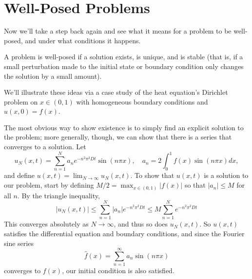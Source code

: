 \documentclass[../m180main.tex]{subfiles}
\begin{document}
\section{Well-Posed Problems}
Now we'll take a step back again and see what it means for a problem to be well-posed, and under what conditions it happens.

\begin{definition}
    A problem is well-posed if a solution exists, is unique, and is stable (that is, if a small perturbation made to the initial state or boundary condition only changes the solution by a small amount).
\end{definition}

We'll illustrate these ideas via a case study of the heat equation's Dirichlet problem on $x \in (0,1)$ with homogeneous boundary conditions and $u(x,0) = f(x)$.

\begin{example}[Existence]
    The most obvious way to show existence is to simply find an explicit solution to the problem; more generally, though, we can show that there is a series that converges to a solution.
    Let
    \[ u_N(x,t) = \sum_{n=1}^{N} a_n e^{-n^2 \pi^2 Dt} \sin(n\pi x), \quad a_n = 2 \int_{0}^{1} f(x) \sin(n\pi x)dx, \]
    and define $u(x,t) = \lim_{N \to \infty} u_N(x,t)$.
    To show that $u(x,t)$ is a solution to our problem, start by defining $M / 2 = \max_{x \in (0,1)} |f(x)|$ so that $|a_n| \leq M$ for all $n$.
    By the triangle inequality,
    \[ |u_N(x,t)| \leq \sum_{n=1}^{N} |a_n| e^{-n^2 \pi^2 Dt} \leq M \sum_{n=1}^{N} e^{-n^2 \pi^2 Dt} \]
    This converges absolutely as $N \to \infty$, and thus so does $u_N(x,t)$.
    So $u(x,t)$ satisfies the differential equation and boundary conditions, and since the Fourier sine series
    \[ \hat f(x) = \sum_{n=1}^{\infty} a_n \sin(n\pi x) \]
    converges to $f(x)$, our initial condition is also satisfied.
\end{example}
\end{document}
